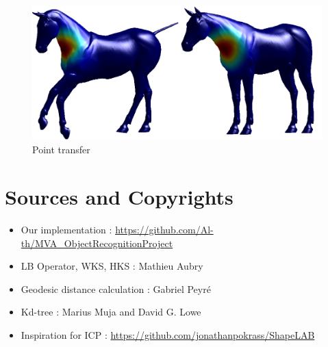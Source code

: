 \documentclass[10pt,twocolumn,letterpaper]{article}
\begin{document}
\begin{figure}[h]
\centering
\includegraphics[width=.3\textwidth]{Images/pointTransfer.png}
\caption{Point transfer}
\label{refinement}
\end{figure}




\section*{Sources and Copyrights}
\begin{itemize}
\setlength\itemsep{0.01em}
\item{Our implementation : \url{https://github.com/Al-th/MVA_ObjectRecognitionProject}}
\item{LB Operator, WKS, HKS : Mathieu Aubry}
\item{Geodesic distance calculation : Gabriel Peyré}
\item{Kd-tree : Marius Muja and David G. Lowe}
\item{Inspiration for ICP : \url{https://github.com/jonathanpokrass/ShapeLAB}}
\end{itemize}


{\small


}
\end{document}
